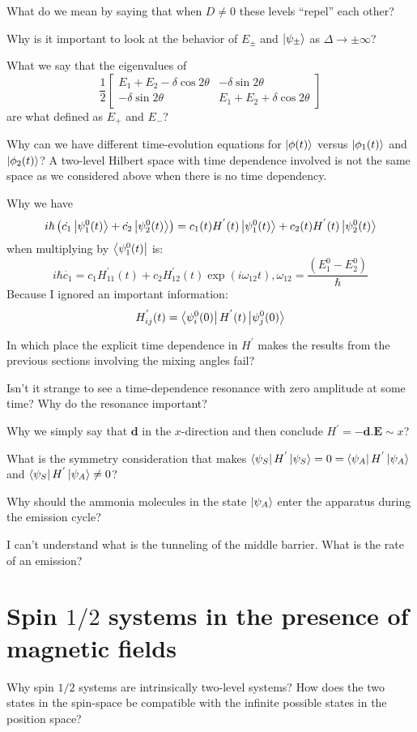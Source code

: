 What do we mean by saying that when $D\not =0$ these levels “repel” each other?

Why is it important to look at the behavior of $E_{\pm}$ and $\left\lvert \psi_{\pm}\right\rangle$ as $\Delta \to\pm\infty$?

What we say that the eigenvalues of
$$
\frac{1}{2}\begin{bmatrix}
E_1+E_2-\delta \cos2\theta&-\delta \sin2\theta\\
-\delta \sin2\theta&E_1+E_2+\delta \cos2\theta
\end{bmatrix}
$$
are what defined as $E_{+}$ and $E_{-}$?

Why can we have different time-evolution equations for $\left\lvert \phi(t)\right\rangle$ versus $\left\lvert \phi_1(t)\right\rangle$ and $\left\lvert \phi_2(t)\right\rangle$? A two-level Hilbert space with time dependence involved is not the same space as we considered above when there is no time dependency.

Why we have 
$$
i\hbar \left(\dot{c_1}\left\lvert \psi_{1}^{0}(t)\right\rangle+\dot{c_2}\left\lvert \psi_{2}^{0}(t)\right\rangle\right)=c_1(t)H^{'}(t)\left\lvert \psi_{1}^{0}(t)\right\rangle+c_2(t)H^{'}(t)\left\lvert \psi_{2}^{0}(t)\right\rangle
$$
when multiplying by $\left\langle \psi_{1}^{0}(t) \right\rvert$ is:
$$
i\hbar \dot{c_1}=c_1H_{11}^{'}(t)+c_2H^{'}_{12}(t)\exp(i\omega_{12}t),\omega_{12}=\frac{(E_{1}^{0}-E_{2}^{0})}{\hbar}
$$
Because I ignored an important information:
$$
H_{ij}^{'}(t)=\left\langle \psi_{i}^{0}(0) \right\rvert{H^{'}(t)}\left\lvert \psi_{j}^{0}(0)\right\rangle
$$

In which place the explicit time dependence in $H^{'}$ makes the results from the previous sections involving the mixing angles fail?

Isn't it strange to see a time-dependence resonance with zero amplitude at some time? Why do the resonance important?

Why we simply say that $\boldsymbol{d}$ in the $x$-direction and then conclude $H^{'}=-\boldsymbol{d}.\boldsymbol{E}\sim x$?

What is the symmetry consideration that makes $\left\langle \psi_S \right\rvert H^{'}\left\lvert \psi_S\right\rangle=0=\left\langle \psi_A \right\rvert H^{'}\left\lvert \psi_A\right\rangle$ and $\left\langle \psi_S \right\rvert H^{'}\left\lvert \psi_A\right\rangle\not=0$?

Why should the ammonia molecules in the state $\left\lvert \psi_A\right\rangle$ enter the apparatus during the emission cycle? 

I can't understand what is the tunneling of the middle barrier. What is the rate of an emission?

\section{Spin $1/2$ systems in the presence of magnetic fields}
Why spin $1/2$ systems are intrinsically two-level systems? How does the two states in the spin-space be compatible with the infinite possible states in the position space?


